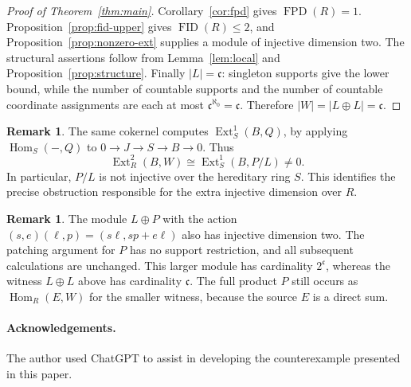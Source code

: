 \documentclass[11pt]{amsart}
\theoremstyle{definition}
\newtheorem{remark}[theorem]{Remark}
\DeclareMathOperator{\FPD}{FPD}
\DeclareMathOperator{\FID}{FID}
\DeclareMathOperator{\Hom}{Hom}
\DeclareMathOperator{\Ext}{Ext}
\newcommand{\cc}{\mathfrak c}
\numberwithin{equation}{section}
\begin{document}
\begin{proof}[Proof of Theorem~\ref{thm:main}]
Corollary~\ref{cor:fpd} gives $\FPD(R)=1$.
Proposition~\ref{prop:fid-upper} gives $\FID(R)\leq2$, and
Proposition~\ref{prop:nonzero-ext} supplies a module of injective
dimension two. The structural assertions follow from
Lemma~\ref{lem:local} and Proposition~\ref{prop:structure}.
Finally $|L|=\cc$: singleton supports give the lower bound, while
the number of countable supports and the number of countable
coordinate assignments are each at most
$\cc^{\aleph_0}=\cc$. Therefore $|W|=|L\oplus L|=\cc$.
\end{proof}

\begin{remark}\label{rem:noninjective-Q}
The same cokernel computes $\Ext_S^1(B,Q)$, by applying
$\Hom_S(-,Q)$ to $0\to J\to S\to B\to0$. Thus
\[
 \Ext_R^2(B,W)\cong\Ext_S^1(B,P/L)\ne0.
\]
In particular, $P/L$ is not injective over the hereditary ring $S$.
This identifies the precise obstruction responsible for the extra
injective dimension over $R$.
\end{remark}

\begin{remark}\label{rem:larger-witness}
The module $L\oplus P$ with the action
$(s,e)(\ell,p)=(s\ell,sp+e\ell)$ also has injective dimension two.
The patching argument for $P$ has no support restriction, and all
subsequent calculations are unchanged. This larger module has
cardinality $2^{\cc}$, whereas the witness $L\oplus L$ above has
cardinality $\cc$. The full product $P$ still occurs as
$\Hom_R(E,W)$ for the smaller witness, because the source $E$ is a
direct sum.
\end{remark}

\paragraph*{Acknowledgements.} The author used ChatGPT to assist in developing the counterexample presented in this paper.
\end{document}
